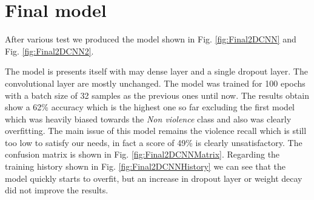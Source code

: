 \section{Final model}
After various test we produced the model shown in Fig. \ref{fig:Final2DCNN} and Fig. \ref{fig:Final2DCNN2}.

The model is presents itself with may dense layer and a single dropout layer. The convolutional layer are mostly unchanged. The model was trained for 100 epochs with a batch size of 32 samples as the previous ones until now. The results obtain show a 62\% accuracy which is the highest one so far excluding the first model which was heavily biased towards the \textit{Non violence} class and also was clearly overfitting. The main issue of this model remains the violence recall which is still too low to satisfy our needs, in fact a score of 49\% is clearly unsatisfactory. The confusion matrix is shown in Fig. \ref{fig:Final2DCNNMatrix}. Regarding the training history shown in Fig. \ref{fig:Final2DCNNHistory} we can see that the model quickly starts to overfit, but an increase in dropout layer or weight decay did not improve the results.

